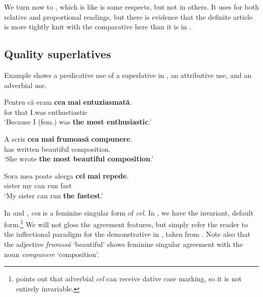 \documentclass[output=paper
,modfonts
,nonflat]{langsci/langscibook}
\begin{document}
We turn now to , which is like  is some respects, but not in others. It uses  for both relative and proportional readings, but there is evidence that the definite article is more tightly knit with the comparative here than it is in .

\subsection{Quality superlatives}

Example  shows a predicative use of a superlative in ,  an attributive use, and  an adverbial use.

\ea \label{ex:coppockstrand:27}
\gll Pentru că eram \textbf{cea} \textbf{mai} \textbf{entuziasmată}.\\
for that I.was  \cmpr{} enthustiastic\\
\glt `Because I (fem.) was \textbf{the most enthusiastic}.' 
\z

\ea \label{ex:coppockstrand:28}
\gll A scris \textbf{cea} \textbf{mai} \textbf{frumoasă} \textbf{compunere}.\\
has written  \cmpr{} beautiful composition.\acc\\
\glt `She wrote \textbf{the most beautiful composition}.'
\z

\ea \label{ex:coppockstrand:29}
\gll Sora mea poate alerga \textbf{cel} \textbf{mai} \textbf{repede}.\\
sister my can run  \cmpr{} fast\\
\glt `My sister can run \textbf{the fastest}.'
\z

In  and , \textit{cea} is a feminine singular form of \textit{cel}.  In , we have the invariant, default form.\footnote{\citet[315]{PanaDindelgan2013} points out that adverbial \textit{cel} can receive dative case marking, so it is not entirely invariable.}
We will not gloss the agreement features, but simply refer the reader to the inflectional paradigm for the demonstrative in , taken from \citet[53]{Cojocaru2003}. 
Note also that the adjective \textit{frumosă} `beautiful' shows feminine singular agreement with the noun \textit{compunere} `composition'.
\end{document}
